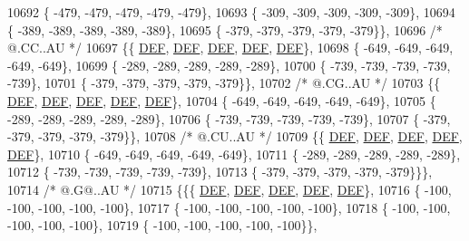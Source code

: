\begin{DoxyCode}
10692 \{ -479, -479, -479, -479, -479\},
10693 \{ -309, -309, -309, -309, -309\},
10694 \{ -389, -389, -389, -389, -389\},
10695 \{ -379, -379, -379, -379, -379\}\},
10696 \textcolor{comment}{/*  @.CC..AU */}
10697 \{\{  \mbox{\hyperlink{1_88_84__epars_8h_a397419fc12b37ed479c8abb9d444d843}{DEF}},  \mbox{\hyperlink{1_88_84__epars_8h_a397419fc12b37ed479c8abb9d444d843}{DEF}},  \mbox{\hyperlink{1_88_84__epars_8h_a397419fc12b37ed479c8abb9d444d843}{DEF}},  \mbox{\hyperlink{1_88_84__epars_8h_a397419fc12b37ed479c8abb9d444d843}{DEF}},  \mbox{\hyperlink{1_88_84__epars_8h_a397419fc12b37ed479c8abb9d444d843}{DEF}}\},
10698 \{ -649, -649, -649, -649, -649\},
10699 \{ -289, -289, -289, -289, -289\},
10700 \{ -739, -739, -739, -739, -739\},
10701 \{ -379, -379, -379, -379, -379\}\},
10702 \textcolor{comment}{/*  @.CG..AU */}
10703 \{\{  \mbox{\hyperlink{1_88_84__epars_8h_a397419fc12b37ed479c8abb9d444d843}{DEF}},  \mbox{\hyperlink{1_88_84__epars_8h_a397419fc12b37ed479c8abb9d444d843}{DEF}},  \mbox{\hyperlink{1_88_84__epars_8h_a397419fc12b37ed479c8abb9d444d843}{DEF}},  \mbox{\hyperlink{1_88_84__epars_8h_a397419fc12b37ed479c8abb9d444d843}{DEF}},  \mbox{\hyperlink{1_88_84__epars_8h_a397419fc12b37ed479c8abb9d444d843}{DEF}}\},
10704 \{ -649, -649, -649, -649, -649\},
10705 \{ -289, -289, -289, -289, -289\},
10706 \{ -739, -739, -739, -739, -739\},
10707 \{ -379, -379, -379, -379, -379\}\},
10708 \textcolor{comment}{/*  @.CU..AU */}
10709 \{\{  \mbox{\hyperlink{1_88_84__epars_8h_a397419fc12b37ed479c8abb9d444d843}{DEF}},  \mbox{\hyperlink{1_88_84__epars_8h_a397419fc12b37ed479c8abb9d444d843}{DEF}},  \mbox{\hyperlink{1_88_84__epars_8h_a397419fc12b37ed479c8abb9d444d843}{DEF}},  \mbox{\hyperlink{1_88_84__epars_8h_a397419fc12b37ed479c8abb9d444d843}{DEF}},  \mbox{\hyperlink{1_88_84__epars_8h_a397419fc12b37ed479c8abb9d444d843}{DEF}}\},
10710 \{ -649, -649, -649, -649, -649\},
10711 \{ -289, -289, -289, -289, -289\},
10712 \{ -739, -739, -739, -739, -739\},
10713 \{ -379, -379, -379, -379, -379\}\}\},
10714 \textcolor{comment}{/*  @.G@..AU */}
10715 \{\{\{  \mbox{\hyperlink{1_88_84__epars_8h_a397419fc12b37ed479c8abb9d444d843}{DEF}},  \mbox{\hyperlink{1_88_84__epars_8h_a397419fc12b37ed479c8abb9d444d843}{DEF}},  \mbox{\hyperlink{1_88_84__epars_8h_a397419fc12b37ed479c8abb9d444d843}{DEF}},  \mbox{\hyperlink{1_88_84__epars_8h_a397419fc12b37ed479c8abb9d444d843}{DEF}},  \mbox{\hyperlink{1_88_84__epars_8h_a397419fc12b37ed479c8abb9d444d843}{DEF}}\},
10716 \{ -100, -100, -100, -100, -100\},
10717 \{ -100, -100, -100, -100, -100\},
10718 \{ -100, -100, -100, -100, -100\},
10719 \{ -100, -100, -100, -100, -100\}\},

\end{DoxyCode}
